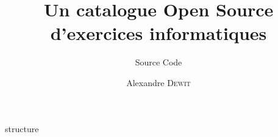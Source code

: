\documentclass{EPL-master-thesis-covers-FR}
\title{Un catalogue Open Source d'exercices informatiques}
\subtitle{Source Code}
\author{Alexandre \textsc{Dewit}}
\begin{document}
  \maketitle
  
  {structure}

  \backcoverpage
\end{document}
